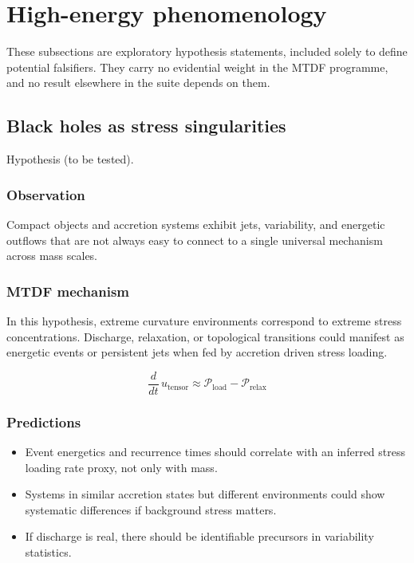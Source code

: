 \documentclass[11pt,a4paper]{article}
\begin{document}
\section{High-energy phenomenology}
\label{sec:high-energy}
These subsections are exploratory hypothesis statements, included solely to define potential falsifiers. They carry no evidential weight in the MTDF programme, and no result elsewhere in the suite depends on them.

\subsection{Black holes as stress singularities}
\begin{mdframed}[linecolor=accent,linewidth=0.5pt,backgroundcolor=callout-bg,leftline=true,rightline=true,topline=true,bottomline=true,innerleftmargin=8pt,innerrightmargin=8pt,innertopmargin=6pt,innerbottommargin=6pt]
Hypothesis (to be tested).
\end{mdframed}

\subsubsection{Observation}
Compact objects and accretion systems exhibit jets, variability, and energetic outflows that are not always easy to connect to a single universal mechanism across mass scales.

\subsubsection{MTDF mechanism}
In this hypothesis, extreme curvature environments correspond to extreme stress concentrations. Discharge, relaxation, or topological transitions could manifest as energetic events or persistent jets when fed by accretion driven stress loading.

$$
\frac{d}{dt}\,u_{\mathrm{tensor}} \approx \mathcal{P}_{\mathrm{load}} - \mathcal{P}_{\mathrm{relax}}
$$

\subsubsection{Predictions}
\begin{itemize}
  \item Event energetics and recurrence times should correlate with an inferred stress loading rate proxy, not only with mass.
  \item Systems in similar accretion states but different environments could show systematic differences if background stress matters.
  \item If discharge is real, there should be identifiable precursors in variability statistics.
\end{itemize}
\end{document}
